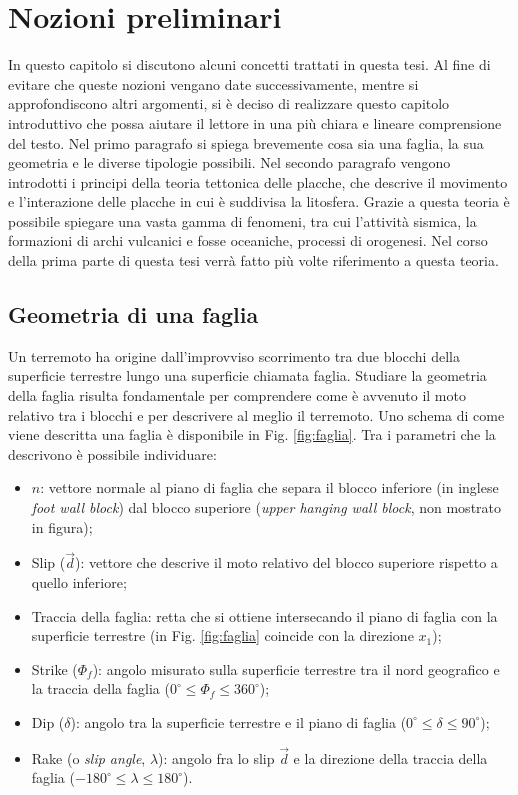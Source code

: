 \chapter{Nozioni preliminari}

In questo capitolo si discutono alcuni concetti trattati in questa tesi. Al fine di evitare che queste nozioni vengano date successivamente, mentre si approfondiscono altri argomenti, si è deciso di realizzare questo capitolo introduttivo che possa aiutare il lettore in una più chiara e lineare comprensione del testo. Nel primo paragrafo si spiega brevemente cosa sia una faglia, la sua geometria e le diverse tipologie possibili.
Nel secondo paragrafo vengono introdotti i principi della teoria tettonica delle placche, che descrive il movimento e l'interazione delle placche in cui è suddivisa la litosfera.
Grazie a questa teoria è possibile spiegare una vasta gamma di fenomeni, tra cui l'attività sismica, la formazioni di archi vulcanici e fosse oceaniche, processi di orogenesi. Nel corso della prima parte di questa tesi verrà fatto più volte riferimento a questa teoria.

\section{Geometria di una faglia}
Un terremoto ha origine dall'improvviso scorrimento tra due blocchi della superficie terrestre lungo una superficie chiamata faglia.
Studiare la geometria della faglia risulta fondamentale per comprendere come è avvenuto il moto relativo tra i blocchi e per descrivere al meglio il terremoto.
Uno schema di come viene descritta una faglia è disponibile in Fig. \ref{fig:faglia}.
Tra i parametri che la descrivono è possibile individuare:
\begin{itemize}
    \item \( \hat{n} \): vettore normale al piano di faglia che separa il blocco inferiore (in inglese \textit{foot wall block}) dal blocco superiore (\textit{upper hanging wall block}, non mostrato in figura);
    \item Slip (\(\vec{d}\)): vettore che descrive il moto relativo del blocco superiore rispetto a quello inferiore;
    \item Traccia della faglia: retta che si ottiene intersecando il piano di faglia con la superficie terrestre (in Fig. \ref{fig:faglia} coincide con la direzione \(x_1\));
    \item Strike (\(\Phi_f\)): angolo misurato sulla superficie terrestre tra il nord geografico e la traccia della faglia (\( 0^{\circ} \le \Phi_f \le 360^{\circ} \));
    \item Dip (\(\delta\)):  angolo tra la superficie terrestre e il piano di faglia (\( 0^{\circ} \le \delta \le 90^{\circ} \));
    \item Rake (o \textit{slip angle}, \(\lambda\)): angolo fra lo slip \( \vec{d} \) e la direzione della traccia della faglia (\( -180^{\circ} \le \lambda \le 180^{\circ} \)).
\end{itemize}

